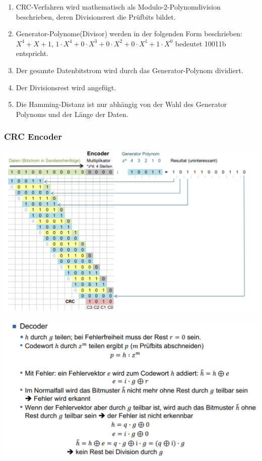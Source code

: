 \begin{enumerate}
    \item CRC-Verfahren wird mathematisch als Modulo-2-Polynomdivision beschrieben, deren Divisionsrest die Prüfbits bildet.
    \item Generator-Polynome(Divisor) werden in der folgenden Form beschrieben: $X^4 + X + 1$, $1 \cdot X^4 + 0 \cdot X^3 + 0 \cdot X^2 + 0 \cdot X^1 + 1 \cdot X^0$ bedeutet 10011b entspricht.
    \item Der gesamte Datenbitstrom wird durch das Generator-Polynom dividiert.
    \item Der Divisionsrest wird angefügt.
    \item Die Hamming-Distanz ist nur abhängig von der Wahl des Generator Polynoms und der Länge der Daten.
\end{enumerate}

\subsubsection{CRC Encoder}%
\label{ssub:crc_encoder}

\begin{center}
    \includegraphics[width=1\linewidth]{images/crcen.png}
\end{center}

\begin{center}
    \includegraphics[width=1\linewidth]{images/crcdec.png}
\end{center}

